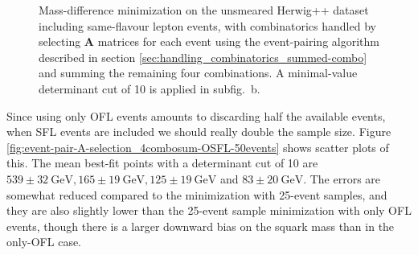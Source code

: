 \documentclass[twoside,english]{uiofysmaster}
\begin{document}
\begin{figure}[hbt]
\begin{subfigure}[b]{0.45\textwidth}
		\caption{ }
		\label{fig:event-pair-A-selection_4combosum-OSFL_b} 
	\end{subfigure}
	\caption{Mass-difference minimization on the unsmeared Herwig++ dataset including same-flavour lepton events, with combinatorics handled by selecting $\mathbf{A}$ matrices for each event using the event-pairing algorithm described in section \ref{sec:handling_combinatorics_summed-combo} and summing the remaining four combinations. A minimal-value determinant cut of 10 is applied in subfig.\ b.}
	\label{fig:event-pair-A-selection_4combosum-OSFL}
\end{figure}

Since using only OFL events amounts to discarding half the available events, when SFL events are included we should really double the sample size. Figure \ref{fig:event-pair-A-selection_4combosum-OSFL-50events} shows scatter plots of this. The mean best-fit points with a determinant cut of 10 are $539 \pm 32~\mathrm{GeV}, 165 \pm 19~\mathrm{GeV}, 125 \pm 19~\mathrm{GeV}$ and $83 \pm 20~\mathrm{GeV}$. The errors are somewhat reduced compared to the minimization with 25-event samples, and they are also slightly lower than the 25-event sample minimization with only OFL events, though there is a larger downward bias on the squark mass than in the only-OFL case.
\end{document}
